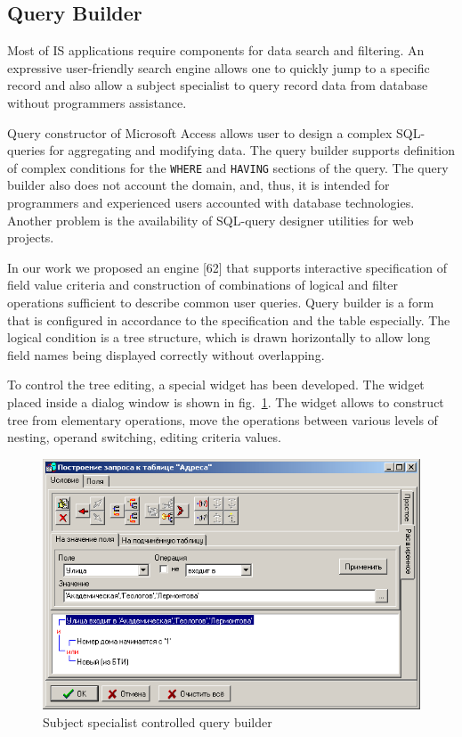 \documentclass[conference]{IEEEtran}
\begin{document}
\subsection{Query Builder}
\label{sec:query-builder}

Most of IS applications require components for data search and filtering.  An expressive user-friendly search engine allows one to quickly jump to a specific record and also allow a subject specialist to query record data from database without programmers assistance.

Query constructor of Microsoft Access allows user to design a complex SQL-queries for aggregating and modifying data.  The query builder supports definition of complex conditions for the \texttt{WHERE} and \texttt{HAVING} sections of the query.  The query builder also does not account the domain, and, thus, it is intended for programmers and experienced users accounted with database technologies.  Another problem is the availability of SQL-query designer utilities for web projects.

In our work we proposed an engine [62] that supports interactive specification of field value criteria and construction of combinations of logical and filter operations sufficient to describe common user queries.  Query builder is a form that is configured in accordance to the specification and the table especially.  The logical condition is a tree structure, which is drawn horizontally to allow long field names being displayed correctly without overlapping.

To control the tree editing, a special widget has been developed.  The widget placed inside a dialog window is shown in fig.~\ref{fig:qbuilder}.  The widget allows to construct tree from elementary operations, move the operations between various levels of nesting, operand switching, editing criteria values.

\begin{figure}[tb]
  \centering
  \includegraphics[width=\linewidth]{qbuilder.png}
  \caption{Subject specialist controlled query builder}
  \label{fig:qbuilder}
\end{figure}
\end{document}
